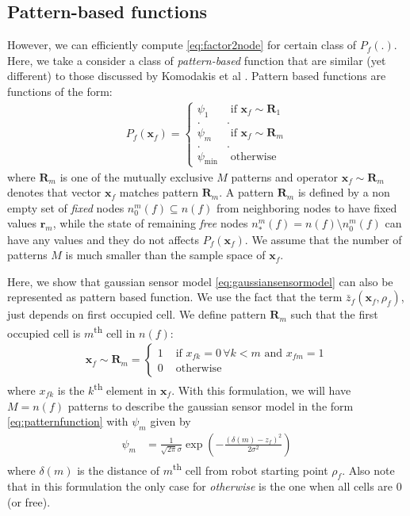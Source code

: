 \documentclass[letterpaper, 10 pt, conference]{ieeeconf} %
\newcommand{\vect}[1]{\mathbf{#1}}
\begin{document}
\subsection{Pattern-based functions}
\label{sec:patternfunctions}
However, we can efficiently compute \eqref{eq:factor2node} for certain class of
$P_f(.)$. Here, we take a consider a class of \emph{pattern-based} function
that are similar (yet different) to those discussed by Komodakis et al
\cite{komodakis2009beyond}. Pattern based functions are functions of the form:
\begin{align}
  P_f(\vect{x}_f) = \begin{cases}
    \psi_{1} & \text{ if $\vect{x}_f \sim \vect{R}_1$}\\
            .&.\\
    \psi_{m} & \text{ if $\vect{x}_f \sim \vect{R}_m$}\\
            .&.\\
    \psi_{\text{min}} & \text{ otherwise}
  \end{cases}
  \label{eq:patternfunction}
\end{align}
where $\vect{R}_m$ is one of the mutually exclusive $M$ patterns and operator
$\vect{x}_f \sim \vect{R}_m$ denotes that vector $\vect{x}_f$ matches pattern
$\vect{R}_m$.  
A pattern $\vect{R}_m$ is defined by a non empty set of \emph{fixed} nodes
$n^m_0(f) \subseteq n(f)$ from neighboring nodes to have fixed values $\vect{r}_m$, 
while the state of remaining \emph{free} nodes $n^m_*(f) = n(f) \setminus
n^m_0(f)$ can have any values and they do not affects $P_f(\vect{x}_f)$.
We assume that the number
of patterns $M$ is much smaller than the sample space of $\vect{x}_f$.

Here, we show that gaussian sensor
model \eqref{eq:gaussiansensormodel} can also be represented as pattern based function. 
We use the fact that the term $\bar{z}_f(\vect{x}_f, \rho_f)$, just depends on
first occupied cell. We define pattern $\vect{R}_m$ such that the first
occupied cell is $m$\textsuperscript{th} cell in $n(f)$:
\begin{align}
  \vect{x}_f \sim \vect{R}_m = \begin{cases}
    1 & \text{ if $x_{fk} = 0 \, \forall k < m$ and $x_{fm} = 1$}\\
    0 & \text{ otherwise}
  \end{cases}
\end{align}
where $x_{fk}$ is the $k$\textsuperscript{th} element in $\vect{x}_f$. With
this formulation, we will have $M = n(f)$ patterns to describe the gaussian
sensor model in the form \eqref{eq:patternfunction} with $\psi_m$ given by
\begin{align}
  \psi_m &= \frac{1}{\sqrt{2\pi}\sigma}\exp\left(-\frac{(\delta(m)- z_f)^2}{2\sigma^2}\right)
\end{align}
where $\delta(m)$ is the distance of $m$\textsuperscript{th} cell from robot
starting point $\rho_f$. Also note that in this formulation the only case for
\emph{otherwise} is the one when all cells are $0$ (or free).
\end{document}

